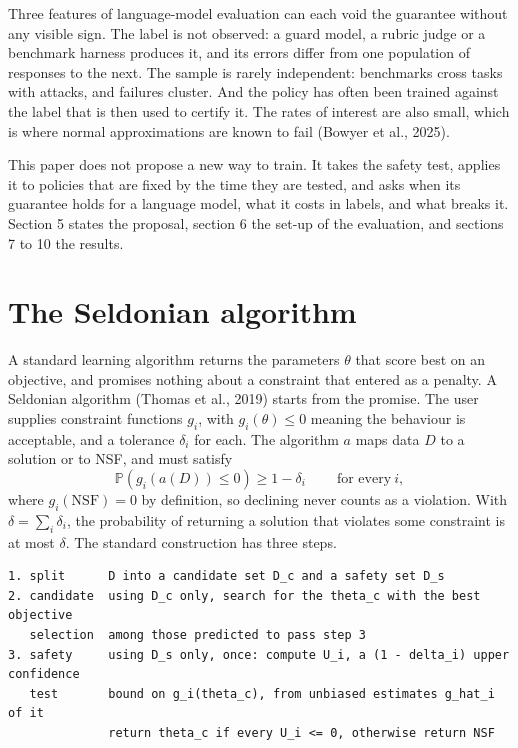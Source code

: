 \documentclass[11pt]{article}
\begin{document}
Three features of language-model evaluation can each void the guarantee without any visible sign. The label is not observed: a guard model, a rubric judge or a benchmark harness produces it, and its errors differ from one population of responses to the next. The sample is rarely independent: benchmarks cross tasks with attacks, and failures cluster. And the policy has often been trained against the label that is then used to certify it. The rates of interest are also small, which is where normal approximations are known to fail (Bowyer et al., 2025).


This paper does not propose a new way to train. It takes the safety test, applies it to policies that are fixed by the time they are tested, and asks when its guarantee holds for a language model, what it costs in labels, and what breaks it. Section 5 states the proposal, section 6 the set-up of the evaluation, and sections 7 to 10 the results.


\section{The Seldonian algorithm}

A standard learning algorithm returns the parameters $\theta$ that score best on an objective, and promises nothing about a constraint that entered as a penalty. A Seldonian algorithm (Thomas et al., 2019) starts from the promise. The user supplies constraint functions $g_{i}$, with $g_{i} (\theta ) \le 0$ meaning the behaviour is acceptable, and a tolerance $\delta_{i}$ for each. The algorithm $a$ maps data $D$ to a solution or to NSF, and must satisfy
\[
\mathbb{P} ( g_{i} (a (D )) \le 0 ) \ge 1 - \delta_{i} \qquad\ \text{for every}\ i ,
\]
where $g_{i} (\mathrm{NSF} ) = 0$ by definition, so declining never counts as a violation. With $\delta = \sum_{i} \delta_{i}$, the probability of returning a solution that violates some constraint is at most $\delta$. The standard construction has three steps.
\begin{Verbatim}[fontsize=\small]
1. split      D into a candidate set D_c and a safety set D_s
2. candidate  using D_c only, search for the theta_c with the best objective
   selection  among those predicted to pass step 3
3. safety     using D_s only, once: compute U_i, a (1 - delta_i) upper confidence
   test       bound on g_i(theta_c), from unbiased estimates g_hat_i of it
              return theta_c if every U_i <= 0, otherwise return NSF
\end{Verbatim}
\end{document}

